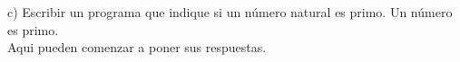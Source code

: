 \newpage
\Large
c) Escribir un programa que indique si un número natural es primo. Un número es primo.\\
\newline
\large
Aqui pueden comenzar a poner sus respuestas.\\